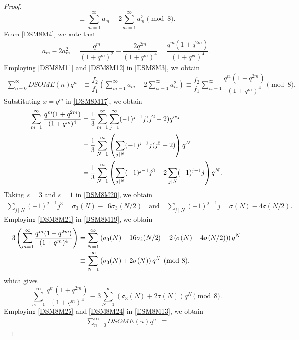 \documentclass[12pt]{article}
\numberwithin{equation}{section}
\theoremstyle{definition}
\theoremstyle{remark}
\numberwithin{equation}{section}
\begin{document}
\begin{proof}
\begin{equation}
\equiv
\sum_{m=1}^{\infty}a_m
-
2\sum_{m=1}^{\infty}a_m^2
\pmod8.
\end{equation}
From  \eqref{DSM8M4}, we note that 
\begin{align}
a_m-2a_m^2
=
\dfrac{q^m}{(1+q^m)^2}
-
\dfrac{2q^{2m}}{(1+q^m)^4}
=
\dfrac{q^m(1+q^{2m})}{(1+q^m)^4}.
\label{DSM8M12}
\end{align}
Employing  \eqref{DSM8M11} and
\eqref{DSM8M12} in \eqref{DSM8M3}, we obtain
\begin{align}
\sum_{n=0}^{\infty}DSOME(n)q^n
&\equiv
\dfrac{f_2}{f_1}
\left(
\sum_{m=1}^{\infty}a_m
-
2\sum_{m=1}^{\infty}a_m^2
\right)
\equiv
\dfrac{f_2}{f_1}
\sum_{m=1}^{\infty}
\dfrac{q^m(1+q^{2m})}{(1+q^m)^4}
\pmod8.
\label{DSM8M13}
\end{align}
Substituting $x=q^m$ in \eqref{DSM8M17}, we obtain
\begin{align}
\sum_{m=1}^{\infty}
\dfrac{q^m(1+q^{2m})}{(1+q^m)^4}
&=
\dfrac{1}{3}
\sum_{m=1}^{\infty}
\sum_{j=1}^{\infty}
(-1)^{j-1}j(j^2+2)q^{mj}
\notag\\
&=
\dfrac{1}{3}
\sum_{N=1}^{\infty}
\left(
\sum_{j\mid N}
(-1)^{j-1}j(j^2+2)
\right)q^N
\notag\\
&\label{DSM8M19}=
\dfrac{1}{3}
\sum_{N=1}^{\infty}
\left(
\sum_{j\mid N}(-1)^{j-1}j^3
+
2\sum_{j\mid N}(-1)^{j-1}j
\right)q^N.
\end{align}
Taking $s=3$ and $s=1$ in \eqref{DSM8M20}, we obtain
\begin{align}
\sum_{j\mid N}(-1)^{j-1}j^3
=
\sigma_3(N)-16\sigma_3(N/2)\quad 
\text{and}\quad 
\sum_{j\mid N}(-1)^{j-1}j
=
\sigma(N)-4\sigma(N/2).
\label{DSM8M21}
\end{align}
Employing \eqref{DSM8M21} in \eqref{DSM8M19}, we obtain
\begin{align}
3
\left(
\sum_{m=1}^{\infty}
\dfrac{q^m(1+q^{2m})}{(1+q^m)^4}
\right)
&=
\sum_{N=1}^{\infty}\left(\sigma_3(N)-16\sigma_3(N/2)+
2\left(
\sigma(N)-4\sigma(N/2)
\right)\right)q^N
\notag\\
&\equiv
\sum_{N=1}^{\infty}\left(\sigma_3(N)+2\sigma(N)\right)q^N
\pmod8,\notag
\end{align}
which gives
\begin{equation}\label{DSM8M24}
\sum_{m=1}^{\infty}
\dfrac{q^m(1+q^{2m})}{(1+q^m)^4}
\equiv
3\sum_{N=1}^{\infty}
\left(
\sigma_3(N)+2\sigma(N)
\right)q^N
\pmod8.
\end{equation}
Employing  \eqref{DSM8M25} and \eqref{DSM8M24} in \eqref{DSM8M13}, we obtain
\begin{align}
\sum_{n=0}^{\infty}DSOME(n)q^n
&\equiv

\end{align}
\end{proof}
\end{document}
